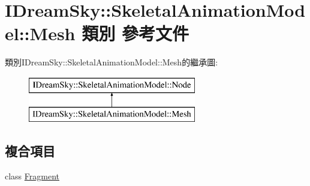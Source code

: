 \hypertarget{class_i_dream_sky_1_1_skeletal_animation_model_1_1_mesh}{}\section{I\+Dream\+Sky\+:\+:Skeletal\+Animation\+Model\+:\+:Mesh 類別 參考文件}
\label{class_i_dream_sky_1_1_skeletal_animation_model_1_1_mesh}
類別\+I\+Dream\+Sky\+:\+:Skeletal\+Animation\+Model\+:\+:Mesh的繼承圖\+:\begin{figure}[H]
\begin{center}
\leavevmode
\includegraphics[height=2.000000cm]{class_i_dream_sky_1_1_skeletal_animation_model_1_1_mesh}
\end{center}
\end{figure}
\subsection*{複合項目}
\begin{DoxyCompactItemize}
\item 
class \hyperlink{class_i_dream_sky_1_1_skeletal_animation_model_1_1_mesh_1_1_fragment}{Fragment}
\end{DoxyCompactItemize}
